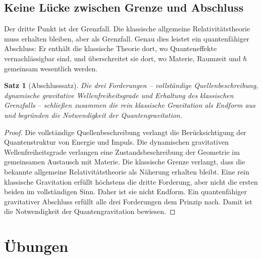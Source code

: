 \documentclass[11pt,a4paper,openany]{book}
\newtheorem{satz}{Satz}[chapter]
\theoremstyle{remark}
\begin{document}
\section{Keine Lücke zwischen Grenze und Abschluss}
Der dritte Punkt ist der Grenzfall. Die klassische allgemeine Relativitätstheorie muss erhalten bleiben, aber als Grenzfall. Genau dies leistet ein quantenfähiger Abschluss: Er enthält die klassische Theorie dort, wo Quanteneffekte vernachlässigbar sind, und überschreitet sie dort, wo Materie, Raumzeit und $\hbar$ gemeinsam wesentlich werden.

\begin{satz}[Abschlusssatz]
Die drei Forderungen -- vollständige Quellenbeschreibung, dynamische gravitative Wellenfreiheitsgrade und Erhaltung des klassischen Grenzfalls -- schließen zusammen die rein klassische Gravitation als Endform aus und begründen die Notwendigkeit der Quantengravitation.
\end{satz}
\begin{proof}
Die vollständige Quellenbeschreibung verlangt die Berücksichtigung der Quantenstruktur von Energie und Impuls. Die dynamischen gravitativen Wellenfreiheitsgrade verlangen eine Zustandsbeschreibung der Geometrie im gemeinsamen Austausch mit Materie. Die klassische Grenze verlangt, dass die bekannte allgemeine Relativitätstheorie als Näherung erhalten bleibt. Eine rein klassische Gravitation erfüllt höchstens die dritte Forderung, aber nicht die ersten beiden im vollständigen Sinn. Daher ist sie nicht Endform. Ein quantenfähiger gravitativer Abschluss erfüllt alle drei Forderungen dem Prinzip nach. Damit ist die Notwendigkeit der Quantengravitation bewiesen.
\end{proof}

\chapter{Übungen}
\end{document}
